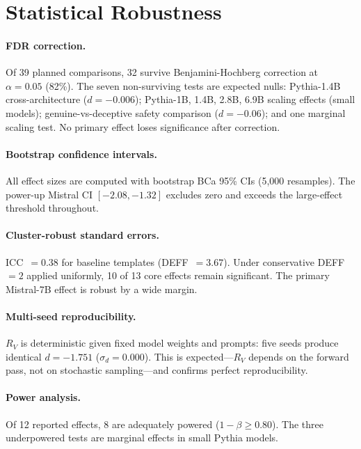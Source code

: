 \documentclass{article}
\newcommand{\RV}{R_V}
\newcommand{\dcohen}{d}
\begin{document}
\appendix

\section{Statistical Robustness}
\label{app:stats}

\paragraph{FDR correction.}
Of 39 planned comparisons, 32 survive Benjamini-Hochberg correction at $\alpha = 0.05$ (82\%).
The seven non-surviving tests are expected nulls: Pythia-1.4B cross-architecture
($\dcohen = -0.006$); Pythia-1B, 1.4B, 2.8B, 6.9B scaling effects (small models);
genuine-vs-deceptive safety comparison ($\dcohen = -0.06$);
and one marginal scaling test.
No primary effect loses significance after correction.

\paragraph{Bootstrap confidence intervals.}
All effect sizes are computed with bootstrap BCa 95\% CIs (5{,}000 resamples).
The power-up Mistral CI $[-2.08, -1.32]$ excludes zero and exceeds the
large-effect threshold throughout.

\paragraph{Cluster-robust standard errors.}
ICC~$= 0.38$ for baseline templates (DEFF~$= 3.67$).
Under conservative DEFF~$= 2$ applied uniformly, 10 of 13 core effects remain significant.
The primary Mistral-7B effect is robust by a wide margin.

\paragraph{Multi-seed reproducibility.}
$\RV$ is deterministic given fixed model weights and prompts: five seeds produce identical
$\dcohen = -1.751$ ($\sigma_d = 0.000$).
This is expected---$\RV$ depends on the forward pass, not on stochastic sampling---and
confirms perfect reproducibility.

\paragraph{Power analysis.}
Of 12 reported effects, 8 are adequately powered ($1 - \beta \geq 0.80$).
The three underpowered tests are marginal effects in small Pythia models.
\end{document}
